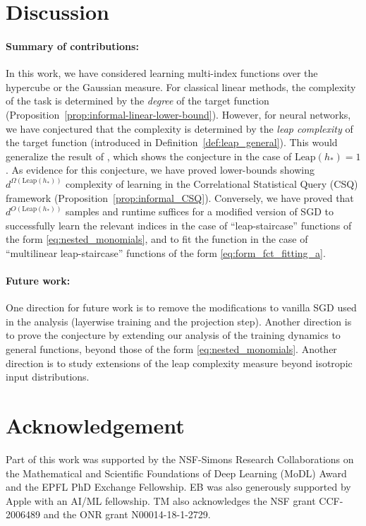 \documentclass[11pt]{article}
\newcommand{\<}{\langle}
\renewcommand{\>}{\rangle}
\theoremstyle{definition}
\def\Leap{\mathrm{Leap}}
\begin{document}
\section{Discussion}
\paragraph{Summary of contributions:} In this work, we have considered learning multi-index functions over the hypercube or the Gaussian measure. For classical linear methods, the complexity of the task is determined by the \textit{degree} of the target function (Proposition~\ref{prop:informal-linear-lower-bound}). However, for neural networks, we have conjectured that the complexity is determined by the \textit{leap complexity} of the target function (introduced in Definition~\ref{def:leap_general}). This would generalize the result of \cite{abbe2022merged}, which shows the conjecture in the case of $\Leap(h_*) = 1$. As evidence for this conjecture, we have proved lower-bounds showing $d^{\Omega(\Leap(h_*))}$ complexity of learning in the Correlational Statistical Query (CSQ) framework 
(Proposition~\ref{prop:informal_CSQ}). Conversely, we have proved that $d^{O(\Leap(h_*))}$ samples and runtime suffices for a modified version of SGD to successfully learn the relevant indices in the case of ``leap-staircase'' functions of the form \eqref{eq:nested_monomials}, and to fit the function in the case of ``multilinear leap-staircase'' functions of the form \eqref{eq:form_fct_fitting_a}.

\paragraph{Future work:} One direction for future work is to remove the modifications to vanilla SGD used in the analysis (layerwise training and the projection step). Another direction is to prove the conjecture by extending our analysis of the training dynamics to general functions, beyond those of the form \eqref{eq:nested_monomials}. Another direction is to study extensions of the leap complexity measure beyond isotropic input distributions.



\section*{Acknowledgement} Part of this work was supported by the NSF-Simons Research Collaborations on the Mathematical and Scientific Foundations of Deep Learning  (MoDL) Award and the EPFL PhD Exchange Fellowship. EB was also generously supported by
Apple with an AI/ML fellowship. TM also acknowledges the NSF grant CCF-2006489 and the ONR grant N00014-18-1-2729.
\end{document}
